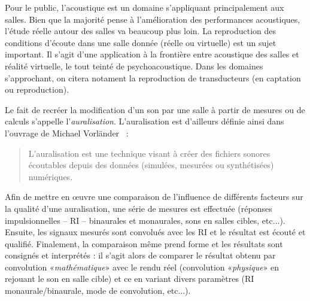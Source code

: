 Pour le public, l'acoustique est un domaine s'appliquant principalement aux salles.
Bien que la majorité pense à l'amélioration des performances acoustiques, l'étude réelle autour des salles va
beaucoup plus loin.
La reproduction des conditions d'écoute dans une salle donnée (réelle ou virtuelle) est un sujet important. Il s'agit d'une
application à la frontière entre acoustique des salles et réalité virtuelle, le tout teinté de psychoacoustique. Dans les
domaines s'approchant, on citera notament la reproduction de transducteurs (en captation ou reproduction).

\medskip

Le fait de recréer la modification d'un son par une salle à partir de mesures ou de calculs s'appelle
l'\emph{auralisation}. L'auralisation est d'ailleurs définie ainsi dans l'ouvrage de Michael
Vorländer~ :

\begin{quote}
L'auralisation est une technique visant à créer des fichiers sonores écoutables depuis des données (simulées, mesurées
ou synthétisées) numériques.
\end{quote}

\medskip

Afin de mettre en œuvre une comparaison de l'influence de différents facteurs sur la qualité d'une auralisation, une
série de mesures est effectuée (réponses impulsionnelles -- RI --  binaurales et monaurales, sons en salles cibles,
etc...).  Ensuite, les signaux mesurés sont convolués avec les RI et le résultat est écouté et qualifié. Finalement, la
comparaison même prend forme et les résultats sont consignés et interprétés : il s'agit alors de comparer le résultat
obtenu par convolution «\emph{mathématique}» avec le rendu réel (convolution «\emph{physique}» en rejouant le son en
salle cible) et ce en variant divers paramètres (RI monaurale/binaurale, mode de convolution, etc...).
